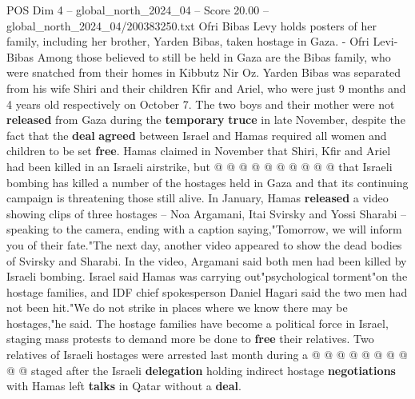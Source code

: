 \begin{textsample}{POS Dim 4 – global\_north\_2024\_04 – Score 20.00 – global\_north\_2024\_04/200383250.txt}
Ofri Bibas Levy holds posters of her family, including her brother, Yarden Bibas, taken hostage in Gaza. - Ofri Levi-Bibas Among those believed to still be held in Gaza are the Bibas family, who were snatched from their homes in Kibbutz Nir Oz.
Yarden Bibas was separated from his wife Shiri and their children Kfir and Ariel, who were just 9 months and 4 years old respectively on October 7.
The two boys and their mother were not \textbf{released} from Gaza during the \textbf{temporary} \textbf{truce} in late November, despite the fact that the \textbf{deal} \textbf{agreed} between Israel and Hamas required all women and children to be set \textbf{free}.
Hamas claimed in November that Shiri, Kfir and Ariel had been killed in an Israeli airstrike, but @ @ @ @ @ @ @ @ @ @ that Israeli bombing has killed a number of the hostages held in Gaza and that its continuing campaign is threatening those still alive.
In January, Hamas \textbf{released} a video showing clips of three hostages -- Noa Argamani, Itai Svirsky and Yossi Sharabi -- speaking to the camera, ending with a caption saying,"Tomorrow, we will inform you of their fate."The next day, another video appeared to show the dead bodies of Svirsky and Sharabi.
In the video, Argamani said both men had been killed by Israeli bombing.
Israel said Hamas was carrying out"psychological torment"on the hostage families, and IDF chief spokesperson Daniel Hagari said the two men had not been hit."We do not strike in places where we know there may be hostages,"he said.
The hostage families have become a political force in Israel, staging mass protests to demand more be done to \textbf{free} their relatives.
Two relatives of Israeli hostages were arrested last month during a @ @ @ @ @ @ @ @ @ @ staged after the Israeli \textbf{delegation} holding indirect hostage \textbf{negotiations} with Hamas left \textbf{talks} in Qatar without a \textbf{deal}.

\end{textsample}
